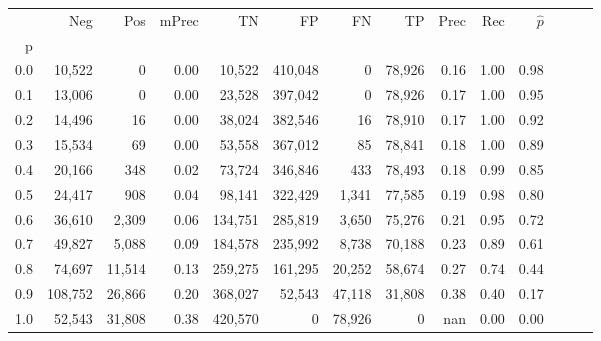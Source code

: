 \begin{tabular}{rrrrrrrrrrrrrr}
\toprule
{} &      Neg &     Pos & mPrec &       TN &       FP &      FN &      TP &  Prec &   Rec & $\hat{p}$ \\
p   &          &         &       &          &          &         &         &       &       &           \\
\midrule
0.0 &   10,522 &       0 &  0.00 &   10,522 &  410,048 &       0 &  78,926 &  0.16 &  1.00 &      0.98 \\
0.1 &   13,006 &       0 &  0.00 &   23,528 &  397,042 &       0 &  78,926 &  0.17 &  1.00 &      0.95 \\
0.2 &   14,496 &      16 &  0.00 &   38,024 &  382,546 &      16 &  78,910 &  0.17 &  1.00 &      0.92 \\
0.3 &   15,534 &      69 &  0.00 &   53,558 &  367,012 &      85 &  78,841 &  0.18 &  1.00 &      0.89 \\
0.4 &   20,166 &     348 &  0.02 &   73,724 &  346,846 &     433 &  78,493 &  0.18 &  0.99 &      0.85 \\
0.5 &   24,417 &     908 &  0.04 &   98,141 &  322,429 &   1,341 &  77,585 &  0.19 &  0.98 &      0.80 \\
0.6 &   36,610 &   2,309 &  0.06 &  134,751 &  285,819 &   3,650 &  75,276 &  0.21 &  0.95 &      0.72 \\
0.7 &   49,827 &   5,088 &  0.09 &  184,578 &  235,992 &   8,738 &  70,188 &  0.23 &  0.89 &      0.61 \\
0.8 &   74,697 &  11,514 &  0.13 &  259,275 &  161,295 &  20,252 &  58,674 &  0.27 &  0.74 &      0.44 \\
0.9 &  108,752 &  26,866 &  0.20 &  368,027 &   52,543 &  47,118 &  31,808 &  0.38 &  0.40 &      0.17 \\
1.0 &   52,543 &  31,808 &  0.38 &  420,570 &        0 &  78,926 &       0 &   nan &  0.00 &      0.00 \\
\bottomrule
\end{tabular}
